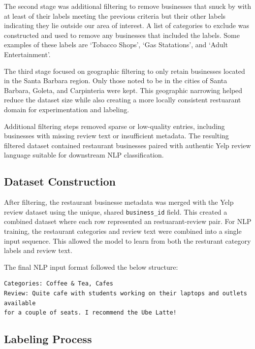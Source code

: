 \documentclass[11pt]{article}
\begin{document}
\medbreak \noindent The second stage was additional filtering to remove businesses that snuck by with at least of their labels meeting 
the previous criteria but their other labels indicating they lie outside our area of interest. A list of categories to exclude was 
constructed and used to remove any businesses that included the labels. Some examples of these labels are `Tobacco Shops', `Gas Statations', 
and `Adult Entertainment'.

\medbreak \noindent The third stage focused on geographic filtering to only retain businesses located in the Santa Barbara region. Only those 
noted to be in the cities of Santa Barbara, Goleta, and Carpinteria were kept. This geographic narrowing helped reduce the dataset size while also 
creating a more locally consistent restuarant domain for experimentation and labeling. 


\medbreak \noindent Additional filtering steps removed sparse or low-quality entries, including businesses with missing review text or 
insufficient metadata. The resulting filtered dataset contained restaurant businesses paired with authentic Yelp review language suitable 
for downstream NLP classification.


\subsection{Dataset Construction}

After filtering, the restaurant businesse metadata was merged with the Yelp review dataset using the unique, shared \texttt{business\_id} field. 
This created a combined dataset where each row represented an restuarant-review pair. For NLP training, the restaurant categories and review text 
were combined into a single input sequence. This allowed the model to learn from both the resturant category labels and review text. 

\medbreak \noindent The final NLP input format followed the below structure: 

\begin{verbatim}
Categories: Coffee & Tea, Cafes 
Review: Quite cafe with students working on their laptops and outlets available 
for a couple of seats. I recommend the Ube Latte!
\end{verbatim}


\subsection{Labeling Process} 
\end{document}
